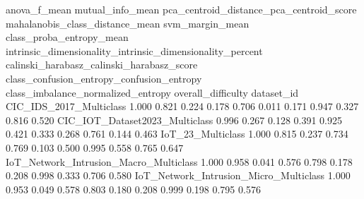                                                                     anova_f_mean mutual_info_mean pca_centroid_distance_pca_centroid_score mahalanobis_class_distance_mean svm_margin_mean class_proba_entropy_mean intrinsic_dimensionality_intrinsic_dimensionality_percent calinski_harabasz_calinski_harabasz_score class_confusion_entropy_confusion_entropy class_imbalance_normalized_entropy                          overall_difficulty
dataset_id                                                                                                                                                                                                                                                                                                                                                                                                                                      
CIC_IDS_2017_Multiclass                                                    1.000            0.821                                    0.224                           0.178           0.706                    0.011                                                     0.171                                     0.947                                     0.327                              0.816   0.520
CIC_IOT_Dataset2023_Multiclass                                             0.996            0.267                                    0.128                           0.391           0.925                    0.421                                                     0.333                                     0.268                                     0.761                              0.144   0.463
IoT_23_Multiclass                                                          1.000            0.815                                    0.237                           0.734           0.769                    0.103                                                     0.500                                     0.995                                     0.558                              0.765   0.647
IoT_Network_Intrusion_Macro_Multiclass                                     1.000            0.958                                    0.041                           0.576           0.798                    0.178                                                     0.208                                     0.998                                     0.333                              0.706   0.580
IoT_Network_Intrusion_Micro_Multiclass                                     1.000            0.953                                    0.049                           0.578           0.803                    0.180                                                     0.208                                     0.999                                     0.198                              0.795   0.576
